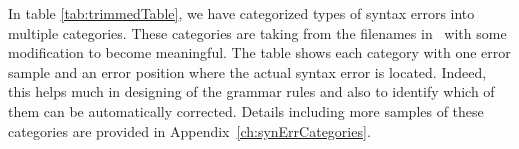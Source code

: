 In table \ref{tab:trimmedTable}, we have categorized types of syntax errors into multiple categories. These categories are taking from the filenames in~\cite{TurtleTests:Online} with some modification to become meaningful. The table shows each category with one error sample and an error position where the actual syntax error is located. Indeed, this helps much in designing of the grammar rules and also to identify which of them can be automatically corrected. Details including more samples of these categories are provided in Appendix~\ref{ch:synErrCategories}.     
